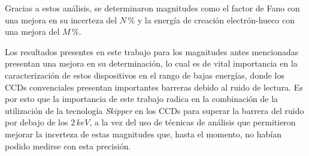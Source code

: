Gracias a estos análisis, se determinaron magnitudes como el factor de Fano con una mejora en su incerteza del $N\,\%$ y la energía de creación electrón-hueco con una mejora del $M\,\%$.

Los resultados presentes en este trabajo para los magnitudes antes mencionadas presentan una mejora en su determinación, lo cual es de vital importancia en la caracterización de estos dispositivos en el rango de bajas energías, donde los CCDs convenciales presentan importantes barreras debido al ruido de lectura. Es por esto que la importancia de este trabajo radica en la combinación de la utilización de la tecnología \textit{Skipper} en los CCDs para superar la barrera del ruido por debajo de los $2\,\si{keV}$, a la vez del uso de técnicas de análisis que permitieron mejorar la incerteza de estas magnitudes que, hasta el momento, no habían podido medirse con esta precisión.

\newpage
\thispagestyle{empty} \mbox{}
\thispagestyle{empty}
